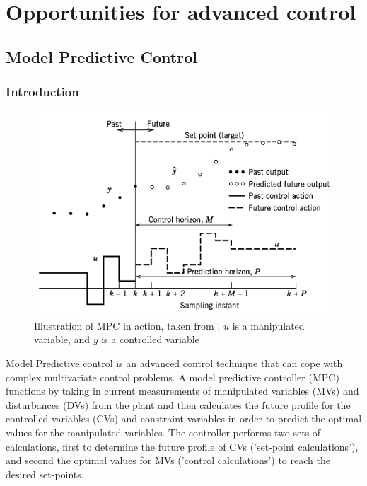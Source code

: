 \section{Opportunities for advanced control}

\subsection{Model Predictive Control}
\subsubsection{Introduction}

 \begin{figure}
        \centering
        \includegraphics[width=\linewidth]{chapters/4-operation-control/4-Figures/MPC-Seborg-2011.png}
        \caption{Illustration of MPC in action, taken from \textcite{}. $u$ is a manipulated variable, and $y$ is a controlled variable}
        \label{fig:MPC}
    \end{figure}

Model Predictive control is an advanced control technique that can cope with complex multivariate control problems. A model predictive controller (MPC) functions by taking in current measurements of manipulated variables (MVs) and disturbances (DVs) from the plant and then calculates the future profile for the controlled variables (CVs) and constraint variables in order to predict the optimal values for the manipulated variables. The controller performs two sets of calculations, first to determine the future profile of CVs ('set-point calculations'), and second the optimal values for MVs ('control calculations') to reach the desired set-points. 

